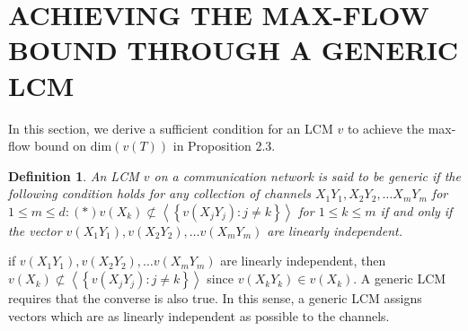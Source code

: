 \documentclass{IEEEtran}
\newtheorem{defi}{Definition}
\begin{document}
\section{ACHIEVING THE MAX-FLOW BOUND THROUGH A GENERIC LCM}\label{sec: ACHIEVING}
\par
In this section, we derive a sufficient condition for an LCM $v$ to achieve the max-flow bound on $\text{dim}(v(T))$ in Proposition 2.3.
\begin{defi}
	An LCM $v$ on a communication network is said to be \emph{generic} if the following condition holds for any collection of channels $X_1Y_1, X_2Y_2, \dots X_mY_m$ for $1\leq m \leq d: (*)v(X_k)\nsubset \left \langle \left \{ v(X_jY_j):j \neq k\right \} \right \rangle$ for $1\leq k \leq m$ if and only if the vector $v(X_1Y_1), v(X_2Y_2), \dots v(X_mY_m)$ are linearly independent.
\end{defi}
\par
if $v(X_1Y_1), v(X_2Y_2), \dots v(X_mY_m)$ are linearly independent, then $v(X_k)\nsubset \left \langle \left \{ v(X_jY_j):j \neq k\right \} \right \rangle$ since $v(X_kY_k)\in v(X_k)$. A generic LCM requires that the converse is also true. In this sense, a generic LCM assigns vectors which are as linearly independent as possible to the channels.
\end{document}
